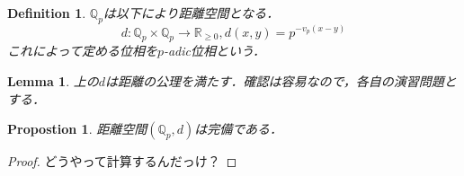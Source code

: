 \documentclass{ujarticle}
\newtheorem{dfn}[thm]{Definition}
\newtheorem{prop}[thm]{Propostion}
\newtheorem{lem}[thm]{Lemma}
\begin{document}
\begin{dfn}
  $\mathbb{Q}_p$は以下により距離空間となる．
  \begin{equation*}
    d : \mathbb{Q}_p \times \mathbb{Q}_p \to \mathbb{R}_{\ge 0},d(x,y)=p^{-v_p(x-y)}
  \end{equation*}
  これによって定める位相を$p$-adic位相という．
\end{dfn}

\begin{lem}
  上の$d$は距離の公理を満たす．確認は容易なので，各自の演習問題とする．
\end{lem}

\begin{prop}
 距離空間$(\mathbb{Q}_p,d)$は完備である．
\end{prop}
\begin{proof}
どうやって計算するんだっけ？
\end{proof}
\end{document}
